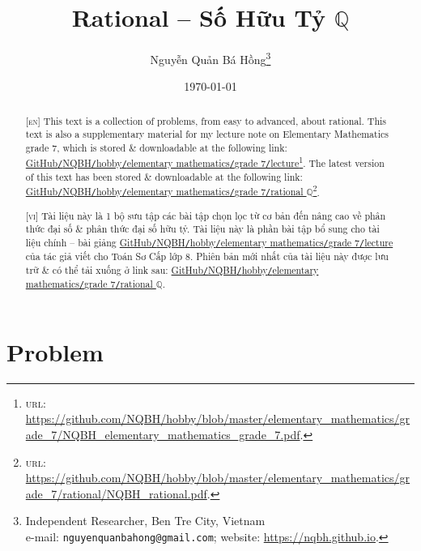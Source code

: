\documentclass{article}
\title{Rational -- Số Hữu Tỷ $\mathbb{Q}$}
\author{Nguyễn Quản Bá Hồng\footnote{Independent Researcher, Ben Tre City, Vietnam\\e-mail: \texttt{nguyenquanbahong@gmail.com}; website: \url{https://nqbh.github.io}.}}
\date{\today}
\numberwithin{equation}{section}
\begin{document}
\maketitle
\begin{abstract}
	\textsc{[en]} This text is a collection of problems, from easy to advanced, about rational. This text is also a supplementary material for my lecture note on Elementary Mathematics grade 7, which is stored \& downloadable at the following link: \href{https://github.com/NQBH/hobby/blob/master/elementary_mathematics/grade_7/NQBH_elementary_mathematics_grade_7.pdf}{GitHub\texttt{/}NQBH\texttt{/}hobby\texttt{/}elementary mathematics\texttt{/}grade 7\texttt{/}lecture}\footnote{\textsc{url}: \url{https://github.com/NQBH/hobby/blob/master/elementary_mathematics/grade_7/NQBH_elementary_mathematics_grade_7.pdf}.}. The latest version of this text has been stored \& downloadable at the following link: \href{https://github.com/NQBH/hobby/blob/master/elementary_mathematics/grade_7/rational/NQBH_rational.pdf}{GitHub\texttt{/}NQBH\texttt{/}hobby\texttt{/}elementary mathematics\texttt{/}grade 7\texttt{/}rational $\mathbb{Q}$}\footnote{\textsc{url}: \url{https://github.com/NQBH/hobby/blob/master/elementary_mathematics/grade_7/rational/NQBH_rational.pdf}.}.
	\vspace{2mm}
	
	\textsc{[vi]} Tài liệu này là 1 bộ sưu tập các bài tập chọn lọc từ cơ bản đến nâng cao về phân thức đại số \& phân thức đại số hữu tỷ. Tài liệu này là phần bài tập bổ sung cho tài liệu chính -- bài giảng \href{https://github.com/NQBH/hobby/blob/master/elementary_mathematics/grade_7/NQBH_elementary_mathematics_grade_7.pdf}{GitHub\texttt{/}NQBH\texttt{/}hobby\texttt{/}elementary mathematics\texttt{/}grade 7\texttt{/}lecture} của tác giả viết cho Toán Sơ Cấp lớp 8. Phiên bản mới nhất của tài liệu này được lưu trữ \& có thể tải xuống ở link sau: \href{https://github.com/NQBH/hobby/blob/master/elementary_mathematics/grade_7/rational/NQBH_rational.pdf}{GitHub\texttt{/}NQBH\texttt{/}hobby\texttt{/}elementary mathematics\texttt{/}grade 7\texttt{/}rational $\mathbb{Q}$}.
\end{abstract}
\setcounter{secnumdepth}{4}
\setcounter{tocdepth}{3}
\tableofcontents


\section{Problem}
\end{document}
